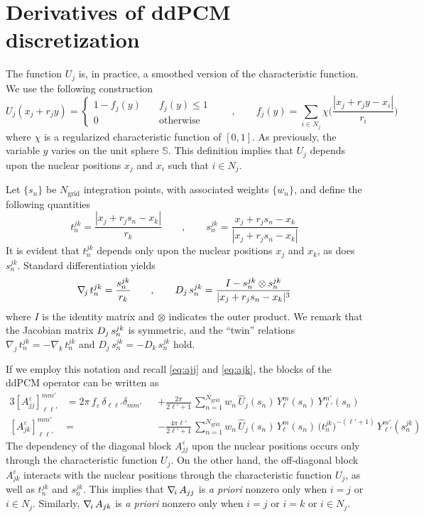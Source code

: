 \section{Derivatives of ddPCM discretization}\label{app:pcm_der}

The function $U_j$ is, in practice, a smoothed version of the characteristic function. We use the following construction
\[
U_j(x_j + r_j y) =
\begin{cases}
1 - f_j(y) 	&\quad f_j(y) \le 1\\
0		&\quad \text{otherwise}
\end{cases}
\qquad , \qquad 
f_j(y) = \sum_{i \in N_j} \chi \bigg(\frac{|x_j + r_j y - x_i|}{r_i}\bigg)
\]
where $\chi$ is a regularized characteristic function of $[0,1]$. As previously, the variable $y$ varies on the unit sphere $\mathbb{S}$. This definition implies that $U_j$ depends upon the nuclear positions $x_j$ and $x_i$ such that $i \in N_j$.



Let $\{ s_n\}$ be $N_\text{grid}$ integration points, with associated weights $\{ w_n \}$, and define the following quantities
\[
t_n^{jk} = \frac{|x_j + r_j s_n -x_k|}{r_k} \qquad , \qquad s_n^{jk} = \frac{x_j + r_j s_n -x_k}{|x_j + r_j s_n -x_k|}%
\]
It is evident that $t_n^{jk}$ depends only upon the nuclear positions $x_j$ and $x_k$, as does $s_n^{jk}$. Standard differentiation yields
\begin{equation}\label{eq:75}
\nabla_{\!j}\, t_n^{jk} = \frac{s_n^{jk}}{r_k} \qquad , \qquad D_j \, s_n^{jk} = \frac{I - s_n^{jk} \otimes s_n^{jk} }{|x_j + r_j s_n - x_k|^3}
\end{equation}
where $I$ is the identity matrix and $\otimes$ indicates the outer product. We remark that the Jacobian matrix $D_j \, s_n^{jk}$ is symmetric, and the ``twin'' relations $\nabla_{\! j} \, t_n^{jk} = - \nabla_{\! k} \, t_n^{jk}$ and $D_j \, s_n^{jk} = - D_k \, s_n^{jk}$ hold.

If we employ this notation and recall \eqref{eq:ajj} and \eqref{eq:ajk}, the blocks of the ddPCM operator can be written as
\begin{alignat*}{3}
{[A_{jj}^\varepsilon]}_{\ell \ell'}^{mm'}& = 2\pi \, f_\varepsilon \, \delta_{\ell \ell'} \delta_{m m'}&& + \frac{2\pi}{2 \ell' + 1} \,\sum_{n= 1}^{N_\text{grid}} w_n \, \hat{U}_j(s_n)  \,Y_\ell^m(s_n) \,  Y_{\ell'}^{m'}(s_n) \\
{[A_{jk}^\varepsilon]}_{\ell \ell'}^{mm'}& =&& -  \frac{4 \pi \ell'}{2 \ell'+1} \, \sum_{n= 1}^{N_\text{grid}} w_n\, \hat{U}_j(s_n) \, Y_\ell^m(s_n) \, \big( t_n^{jk}\big)^{-(\ell'+1)} \, Y_{\ell'}^{m'} (s_n^{jk})
\end{alignat*}
The dependency of the diagonal block $A_{jj}^\varepsilon$ upon the nuclear positions occurs only through the characteristic function $U_j$. On the other hand, the off-diagonal block $A_{jk}^\varepsilon$ interacts with the nuclear positions through the characteristic function $U_j$, as well as $t_n^{jk}$ and $s_n^{jk}$. This implies that $\nabla_{\!i}\, A_{jj}$ is \emph{a priori} nonzero only when $i = j$ or $i \in N_j$. Similarly, $\nabla_{\!i}\, A_{jk}$ is \emph{a priori} nonzero only when $i = j$ or $i = k$ or $i \in N_j$.


